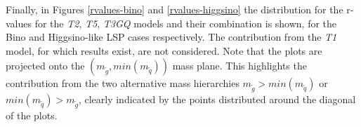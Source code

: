 \documentclass[epj,nopacs,fleqn]{svjour}
\begin{document}
Finally, in Figures \ref{rvalues-bino} and \ref{rvalues-higgsino} the distribution for the r-values for the \textit{T2}, \textit{T5}, \textit{T3GQ} models and their combination is shown, for the Bino and Higgsino-like LSP cases respectively. The contribution from the \textit{T1} model, for which results exist, are not considered. Note that the plots are projected onto the $(m_{\tilde g}, min(m_{\tilde q}))$ mass plane. This highlights the contribution from the two alternative mass hierarchies $m_{\tilde g} > min(m_{\tilde q})$ or $min(m_{\tilde q}) > m_{\tilde g} $, clearly indicated by the points distributed around the diagonal of the plots. 
\\

%
\end{document}
